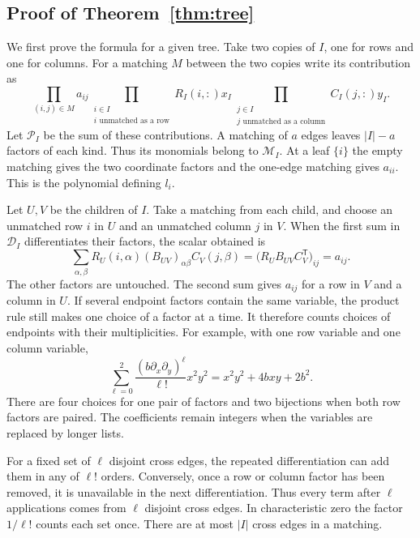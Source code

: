 \documentclass[11pt,reqno]{amsart}
\theoremstyle{remark}
\numberwithin{equation}{section}
\begin{document}
\subsection{Proof of Theorem~\ref{thm:tree}}\label{sec:proof-tree}

We first prove the formula for a given tree. Take two copies of \(I\), one for rows and one for columns. For a
matching \(M\) between the two copies write its contribution as
\begin{equation}\label{eq:partial}
 \prod_{(i,j)\in M}a_{ij}
 \prod_{\substack{i\in I\\i\text{ unmatched as a row}}} R_I(i,:)x_I
 \prod_{\substack{j\in I\\j\text{ unmatched as a column}}} C_I(j,:)y_I.
\end{equation}
Let \(\mathcal P_I\) be the sum of these contributions. A matching of
\(a\) edges leaves \(|I|-a\) factors of each kind. Thus its monomials
belong to \(\mathcal M_I\). At a leaf \(\{i\}\) the empty matching gives
the two coordinate factors and the one-edge matching gives \(a_{ii}\).
This is the polynomial defining \(l_i\).

Let \(U,V\) be the children of \(I\). Take a matching from each child,
and choose an unmatched row \(i\) in \(U\) and an unmatched column \(j\)
in \(V\). When the first sum in \(\mathcal D_I\) differentiates their
factors, the scalar obtained is
\[
 \sum_{\alpha,\beta}R_U(i,\alpha)(B_{UV})_{\alpha\beta}
                              C_V(j,\beta)
       =\big(R_UB_{UV}C_V^{\mathsf T}\big)_{ij}=a_{ij}.
\]
The other factors are untouched. The second sum gives \(a_{ij}\) for a
row in \(V\) and a column in \(U\). If several endpoint factors contain
the same variable, the product rule still makes one choice of a factor at
a time. It therefore counts choices of endpoints with their
multiplicities. For example, with one row variable and one column
variable,
\[
 \sum_{\ell=0}^{2}\frac{(b\partial_x\partial_y)^\ell}{\ell!}
       x^2y^2=x^2y^2+4bxy+2b^2.
\]
There are four choices for one pair of factors and two bijections
when both row factors are paired. The coefficients remain integers
when the variables are replaced by longer lists.

For a fixed set of \(\ell\) disjoint cross edges, the repeated
differentiation can add them in any of \(\ell!\) orders. Conversely, once
a row or column factor has been removed, it is unavailable in the next
differentiation. Thus every term after \(\ell\) applications comes from
\(\ell\) disjoint cross edges. In characteristic zero the factor
\(1/\ell!\) counts each set once. There are at most \(|I|\) cross
edges in a matching.
\end{document}
